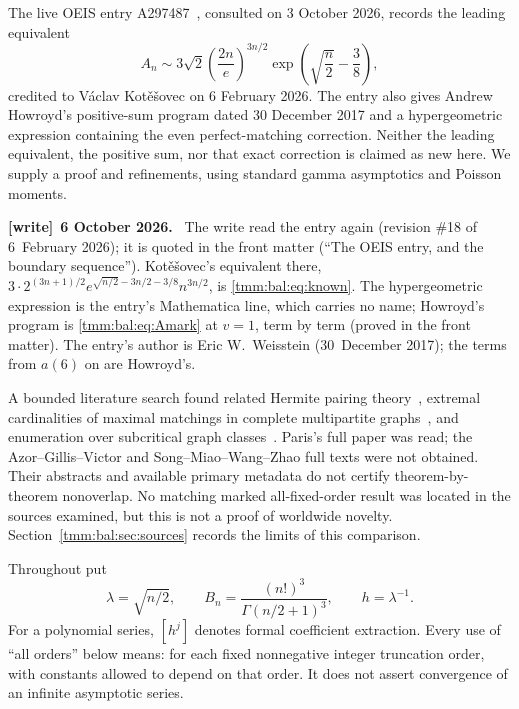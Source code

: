 \documentclass[11pt,letterpaper]{article}
\theoremstyle{remark}\newtheorem{remark}[theorem]{Remark}
\newenvironment{writenote}[1][]{\par\smallskip\begingroup\small
 \noindent\textbf{[write]}\if\relax\detokenize{#1}\relax\else~\textbf{#1.}\fi\ }%
 {\par\endgroup\smallskip}
\begin{document}
The live OEIS entry A297487~\cite{oeis}, consulted on 3 October 2026, records the leading equivalent
\begin{equation}\label{tmm:bal:eq:known}
 A_n\sim 3\sqrt2\left(\frac{2n}{e}\right)^{3n/2}
             \exp\left(\sqrt{\frac n2}-\frac38\right),
\end{equation}
credited to V\'aclav Kot\v e\v sovec on 6 February 2026. The entry also gives Andrew Howroyd's positive-sum program dated 30 December 2017 and a hypergeometric expression containing the even perfect-matching correction. Neither the leading equivalent, the positive sum, nor that exact correction is claimed as new here. We supply a proof and refinements, using standard gamma asymptotics and Poisson moments.
\begin{writenote}[6 October 2026]
The write read the entry again (revision \#18 of 6~February 2026); it is quoted in the front matter (``The OEIS entry, and the boundary sequence''). Kot\v{e}\v{s}ovec's equivalent there, $3\cdot2^{(3n+1)/2}e^{\sqrt{n/2}-3n/2-3/8}n^{3n/2}$, is \eqref{tmm:bal:eq:known}. The hypergeometric expression is the entry's Mathematica line, which carries no name; Howroyd's program is \eqref{tmm:bal:eq:Amark} at $v=1$, term by term (proved in the front matter). The entry's author is Eric W.~Weisstein (30~December 2017); the terms from $a(6)$ on are Howroyd's.
\end{writenote}

A bounded literature search found related Hermite pairing theory~\cite{azor,paris}, extremal cardinalities of maximal matchings in complete multipartite graphs~\cite{song}, and enumeration over subcritical graph classes~\cite{drmota}. Paris's full paper was read; the Azor--Gillis--Victor and Song--Miao--Wang--Zhao full texts were not obtained. Their abstracts and available primary metadata do not certify theorem-by-theorem nonoverlap. No matching marked all-fixed-order result was located in the sources examined, but this is not a proof of worldwide novelty. Section~\ref{tmm:bal:sec:sources} records the limits of this comparison.

Throughout put
\begin{equation}\label{tmm:bal:eq:notation}
 \lambda=\sqrt{n/2},\qquad B_n=\frac{(n!)^3}{\Gamma(n/2+1)^3},
 \qquad h=\lambda^{-1}.
\end{equation}
For a polynomial series, $[h^j]$ denotes formal coefficient extraction. Every use of ``all orders'' below means: for each fixed nonnegative integer truncation order, with constants allowed to depend on that order. It does not assert convergence of an infinite asymptotic series.
\end{document}
